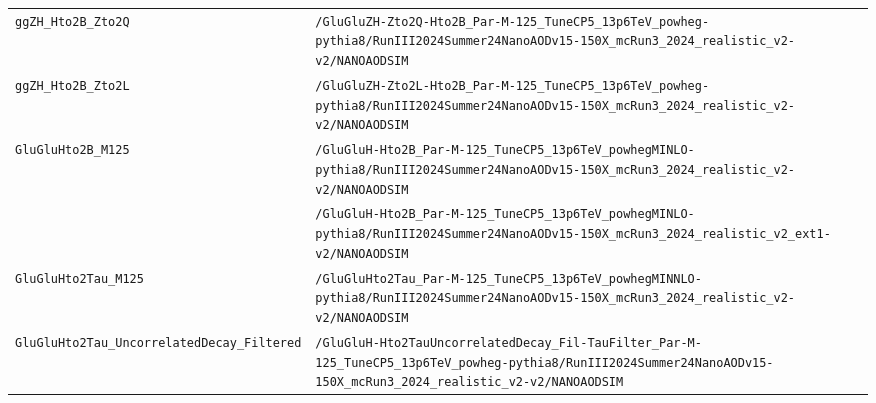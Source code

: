 \begin{longtable}{@{}>{\RaggedRight\arraybackslash}p{} >{\RaggedRight\arraybackslash}p{}@{}}
\addlinespace[2pt]
\texttt{ggZH\_\allowbreak{}Hto2B\_\allowbreak{}Zto2Q} & \texttt{/\allowbreak{}GluGluZH-\allowbreak{}Zto2Q-\allowbreak{}Hto2B\_\allowbreak{}Par-\allowbreak{}M-\allowbreak{}125\_\allowbreak{}TuneCP5\_\allowbreak{}13p6TeV\_\allowbreak{}powheg-\allowbreak{}pythia8/\allowbreak{}RunIII2024Summer24NanoAODv15-\allowbreak{}150X\_\allowbreak{}mcRun3\_\allowbreak{}2024\_\allowbreak{}realistic\_\allowbreak{}v2-\allowbreak{}v2/\allowbreak{}NANOAODSIM} \\
\addlinespace[2pt]
\texttt{ggZH\_\allowbreak{}Hto2B\_\allowbreak{}Zto2L} & \texttt{/\allowbreak{}GluGluZH-\allowbreak{}Zto2L-\allowbreak{}Hto2B\_\allowbreak{}Par-\allowbreak{}M-\allowbreak{}125\_\allowbreak{}TuneCP5\_\allowbreak{}13p6TeV\_\allowbreak{}powheg-\allowbreak{}pythia8/\allowbreak{}RunIII2024Summer24NanoAODv15-\allowbreak{}150X\_\allowbreak{}mcRun3\_\allowbreak{}2024\_\allowbreak{}realistic\_\allowbreak{}v2-\allowbreak{}v2/\allowbreak{}NANOAODSIM} \\
\addlinespace[2pt]
\texttt{GluGluHto2B\_\allowbreak{}M125} & \texttt{/\allowbreak{}GluGluH-\allowbreak{}Hto2B\_\allowbreak{}Par-\allowbreak{}M-\allowbreak{}125\_\allowbreak{}TuneCP5\_\allowbreak{}13p6TeV\_\allowbreak{}powhegMINLO-\allowbreak{}pythia8/\allowbreak{}RunIII2024Summer24NanoAODv15-\allowbreak{}150X\_\allowbreak{}mcRun3\_\allowbreak{}2024\_\allowbreak{}realistic\_\allowbreak{}v2-\allowbreak{}v2/\allowbreak{}NANOAODSIM} \\
 & \texttt{/\allowbreak{}GluGluH-\allowbreak{}Hto2B\_\allowbreak{}Par-\allowbreak{}M-\allowbreak{}125\_\allowbreak{}TuneCP5\_\allowbreak{}13p6TeV\_\allowbreak{}powhegMINLO-\allowbreak{}pythia8/\allowbreak{}RunIII2024Summer24NanoAODv15-\allowbreak{}150X\_\allowbreak{}mcRun3\_\allowbreak{}2024\_\allowbreak{}realistic\_\allowbreak{}v2\_\allowbreak{}ext1-\allowbreak{}v2/\allowbreak{}NANOAODSIM} \\
\addlinespace[2pt]
\texttt{GluGluHto2Tau\_\allowbreak{}M125} & \texttt{/\allowbreak{}GluGluHto2Tau\_\allowbreak{}Par-\allowbreak{}M-\allowbreak{}125\_\allowbreak{}TuneCP5\_\allowbreak{}13p6TeV\_\allowbreak{}powhegMINNLO-\allowbreak{}pythia8/\allowbreak{}RunIII2024Summer24NanoAODv15-\allowbreak{}150X\_\allowbreak{}mcRun3\_\allowbreak{}2024\_\allowbreak{}realistic\_\allowbreak{}v2-\allowbreak{}v2/\allowbreak{}NANOAODSIM} \\
\addlinespace[2pt]
\texttt{GluGluHto2Tau\_\allowbreak{}UncorrelatedDecay\_\allowbreak{}Filtered} & \texttt{/\allowbreak{}GluGluH-\allowbreak{}Hto2TauUncorrelatedDecay\_\allowbreak{}Fil-\allowbreak{}TauFilter\_\allowbreak{}Par-\allowbreak{}M-\allowbreak{}125\_\allowbreak{}TuneCP5\_\allowbreak{}13p6TeV\_\allowbreak{}powheg-\allowbreak{}pythia8/\allowbreak{}RunIII2024Summer24NanoAODv15-\allowbreak{}150X\_\allowbreak{}mcRun3\_\allowbreak{}2024\_\allowbreak{}realistic\_\allowbreak{}v2-\allowbreak{}v2/\allowbreak{}NANOAODSIM} \\

\end{longtable}
